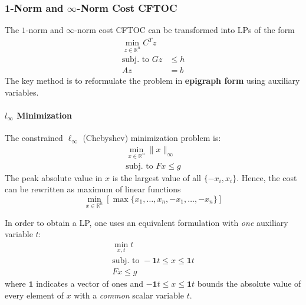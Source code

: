 \subsubsection[1-Norm and Inf-Norm Cost]{1-Norm and $\infty$-Norm Cost CFTOC}


The $1$-norm and $\infty$-norm cost CFTOC can be transformed into LPs of the form
\begin{align*}
    \min_{z\in\mathbb{R}^n}C^T z  \\
    \text{subj.\ to } Gz & \leq h \\
    Az                   & =b
\end{align*}
The key method is to reformulate the problem in \textbf{epigraph form} using auxiliary variables.

\paragraph[linf Minimization]{$l_{\infty}$ Minimization}

The constrained \(\ell_\infty\) (Chebyshev) minimization problem is:
\begin{gather*}
    \min_{x \in \mathbb{R}^n} \|x\|_\infty \\
    \text{subj.\ to } Fx \leq g
\end{gather*}
The peak absolute value in $x$ is the largest value of all $\{-x_i, x_i\}$. Hence, the cost can be rewritten as maximum of linear functions
\begin{equation*}
    \min_{x \in \mathbb{R}^n} \left[\max \{x_1, \dots, x_n, -x_1, \dots, -x_n\}\right]
\end{equation*}

\newpar{}

In order to obtain a LP, one uses an equivalent formulation with \textit{one} auxiliary variable $t$:
\begin{gather*}
    \min_{x, t} t \\
    \text{subj.\ to } -\mathbf{1} t \leq x \leq \mathbf{1} t\\
    Fx \leq g
\end{gather*}
where $\mathbf{1}$ indicates a vector of ones and $-\mathbf{1} t \leq x \leq \mathbf{1} t$ bounds the absolute value of every element of $x$ with a \textit{common} scalar variable $t$.

